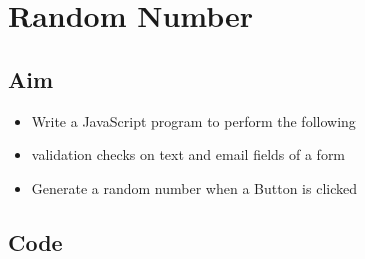 \documentclass{article}
\begin{document}
\section{Random Number}
\subsection{Aim}
\begin{itemize}
  \item Write a JavaScript program to perform the following
	\item validation checks on text and email fields of a form
	\item Generate a random number when a Button is clicked
\end{itemize}

\subsection{Code}
\inputminted[frame=lines, linenos, breaklines, breakanywhere, numberblanklines=false]{html}{./prog_15/index.html}
\end{document}
